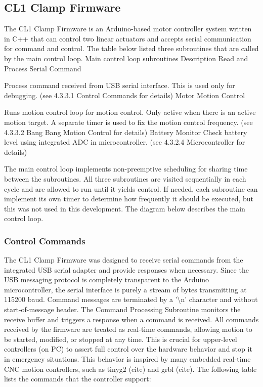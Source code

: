 \subsection{CL1 Clamp Firmware}
\label{subsection:exploration_1_cl1_firmware}

The CL1 Clamp Firmware is an Arduino-based motor controller system written in C++ that can control two linear actuators and accepts serial communication for command and control. The table below listed three subroutines that are called by the main control loop.
Main control loop subroutines
Description
Read and Process Serial Command 


Process command received from USB serial interface. This is used only for debugging. (see 4.3.3.1 Control Commands for details)
Motor Motion Control


Runs motion control loop for motion control. Only active when there is an active motion target. A separate timer is used to fix the motion control frequency. (see 4.3.3.2 Bang Bang Motion Control for details)
Battery Monitor
Check battery level using integrated ADC in microcontroller. 
(see 4.3.2.4 Microcontroller for details)

The main control loop implements non-preemptive scheduling for sharing time between the subroutines. All three subroutines are visited sequentially in each cycle and are allowed to run until it yields control. If needed, each subroutine can implement its own timer to determine how frequently it should be executed, but this was not used in this development. The diagram below describes the main control loop.

\subsubsection{Control Commands}
\label{subsubsection:exploration_1_control_commands}

The CL1 Clamp Firmware was designed to receive serial commands from the integrated USB serial adapter and provide responses when necessary. Since the USB messaging protocol is completely transparent to the Arduino microcontroller, the serial interface is purely a stream of bytes transmitting at 115200 baud. Command messages are terminated by a '\textbackslash n' character and without start-of-message header. The Command Processing Subroutine monitors the receive buffer and triggers a response when a command is received.
All commands received by the firmware are treated as real-time commands, allowing motion to be started, modified, or stopped at any time. This is crucial for upper-level controllers (on PC) to assert full control over the hardware behavior and stop it in emergency situations. This behavior is inspired by many embedded real-time CNC motion controllers, such as tinyg2 (cite) and grbl (cite).
The following table lists the commands that the controller support:

